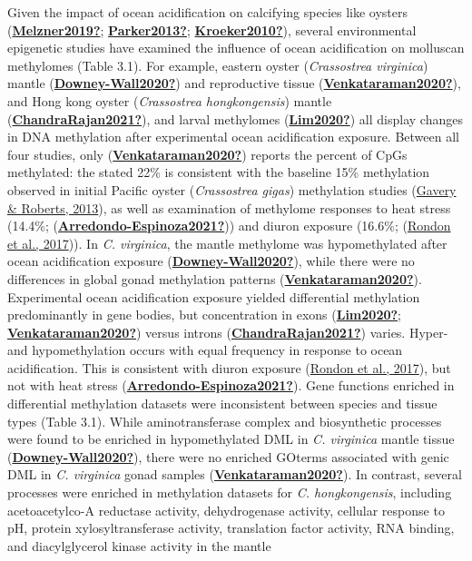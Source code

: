 \documentclass [11pt, proquest] {uwthesis}[2015/03/03]
\begin{document}
Given the impact of ocean acidification on calcifying species like oysters (\protect\hyperlink{ref-Melzner2019}{\textbf{Melzner2019?}}; \protect\hyperlink{ref-Parker2013}{\textbf{Parker2013?}}; \protect\hyperlink{ref-Kroeker2010}{\textbf{Kroeker2010?}}), several environmental epigenetic studies have examined the influence of ocean acidification on molluscan methylomes (Table 3.1). For example, eastern oyster (\emph{Crassostrea virginica}) mantle (\protect\hyperlink{ref-Downey-Wall2020}{\textbf{Downey-Wall2020?}}) and reproductive tissue (\protect\hyperlink{ref-Venkataraman2020}{\textbf{Venkataraman2020?}}), and Hong kong oyster (\emph{Crassostrea hongkongensis}) mantle (\protect\hyperlink{ref-ChandraRajan2021}{\textbf{ChandraRajan2021?}}), and larval methylomes (\protect\hyperlink{ref-Lim2020}{\textbf{Lim2020?}}) all display changes in DNA methylation after experimental ocean acidification exposure. Between all four studies, only (\protect\hyperlink{ref-Venkataraman2020}{\textbf{Venkataraman2020?}}) reports the percent of CpGs methylated: the stated 22\% is consistent with the baseline 15\% methylation observed in initial Pacific oyster (\emph{Crassostrea gigas}) methylation studies (\protect\hyperlink{ref-Gavery2013}{Gavery \& Roberts, 2013}), as well as examination of methylome responses to heat stress (14.4\%; (\protect\hyperlink{ref-Arredondo-Espinoza2021}{\textbf{Arredondo-Espinoza2021?}})) and diuron exposure (16.6\%; (\protect\hyperlink{ref-Rondon2017}{Rondon et al., 2017})). In \emph{C. virginica}, the mantle methylome was hypomethylated after ocean acidification exposure (\protect\hyperlink{ref-Downey-Wall2020}{\textbf{Downey-Wall2020?}}), while there were no differences in global gonad methylation patterns (\protect\hyperlink{ref-Venkataraman2020}{\textbf{Venkataraman2020?}}). Experimental ocean acidification exposure yielded differential methylation predominantly in gene bodies, but concentration in exons (\protect\hyperlink{ref-Lim2020}{\textbf{Lim2020?}}; \protect\hyperlink{ref-Venkataraman2020}{\textbf{Venkataraman2020?}}) versus introns (\protect\hyperlink{ref-ChandraRajan2021}{\textbf{ChandraRajan2021?}}) varies. Hyper- and hypomethylation occurs with equal frequency in response to ocean acidification. This is consistent with diuron exposure (\protect\hyperlink{ref-Rondon2017}{Rondon et al., 2017}), but not with heat stress (\protect\hyperlink{ref-Arredondo-Espinoza2021}{\textbf{Arredondo-Espinoza2021?}}). Gene functions enriched in differential methylation datasets were inconsistent between species and tissue types (Table 3.1). While aminotransferase complex and biosynthetic processes were found to be enriched in hypomethylated DML in \emph{C. virginica} mantle tissue (\protect\hyperlink{ref-Downey-Wall2020}{\textbf{Downey-Wall2020?}}), there were no enriched GOterms associated with genic DML in \emph{C. virginica} gonad samples (\protect\hyperlink{ref-Venkataraman2020}{\textbf{Venkataraman2020?}}). In contrast, several processes were enriched in methylation datasets for \emph{C. hongkongensis}, including acetoacetylco-A reductase activity, dehydrogenase activity, cellular response to pH, protein xylosyltransferase activity, translation factor activity, RNA binding, and diacylglycerol kinase activity in the mantle 
\end{document}
